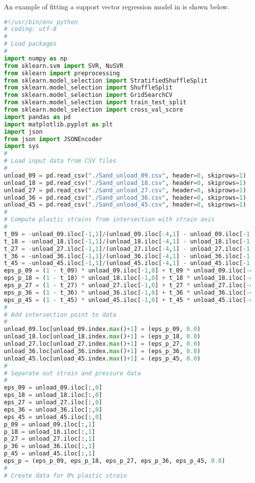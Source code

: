 An example of fitting a support vector regression model in  is shown below.
\begin{lstlisting}[language=Python]
#!/usr/bin/env python
# coding: utf-8
#
# Load packages
#
import numpy as np
from sklearn.svm import SVR, NuSVR
from sklearn import preprocessing
from sklearn.model_selection import StratifiedShuffleSplit
from sklearn.model_selection import ShuffleSplit
from sklearn.model_selection import GridSearchCV
from sklearn.model_selection import train_test_split
from sklearn.model_selection import cross_val_score
import pandas as pd
import matplotlib.pyplot as plt
import json
from json import JSONEncoder
import sys
#
# Load input data from CSV files
#
unload_09 = pd.read_csv("./Sand_unload_09.csv", header=0, skiprows=1)
unload_18 = pd.read_csv("./Sand_unload_18.csv", header=0, skiprows=1)
unload_27 = pd.read_csv("./Sand_unload_27.csv", header=0, skiprows=1)
unload_36 = pd.read_csv("./Sand_unload_36.csv", header=0, skiprows=1)
unload_45 = pd.read_csv("./Sand_unload_45.csv", header=0, skiprows=1)
#
# Compute plastic strains from intersection with strain axis
#
t_09 = -unload_09.iloc[-1,1]/(unload_09.iloc[-4,1] - unload_09.iloc[-1,1])
t_18 = -unload_18.iloc[-1,1]/(unload_18.iloc[-4,1] - unload_18.iloc[-1,1])
t_27 = -unload_27.iloc[-1,1]/(unload_27.iloc[-4,1] - unload_27.iloc[-1,1])
t_36 = -unload_36.iloc[-1,1]/(unload_36.iloc[-4,1] - unload_36.iloc[-1,1])
t_45 = -unload_45.iloc[-1,1]/(unload_45.iloc[-4,1] - unload_45.iloc[-1,1])
eps_p_09 = (1 - t_09) * unload_09.iloc[-1,0] + t_09 * unload_09.iloc[-4,0]
eps_p_18 = (1 - t_18) * unload_18.iloc[-1,0] + t_18 * unload_18.iloc[-4,0]
eps_p_27 = (1 - t_27) * unload_27.iloc[-1,0] + t_27 * unload_27.iloc[-4,0]
eps_p_36 = (1 - t_36) * unload_36.iloc[-1,0] + t_36 * unload_36.iloc[-4,0]
eps_p_45 = (1 - t_45) * unload_45.iloc[-1,0] + t_45 * unload_45.iloc[-4,0]
#
# Add intersection point to data
#
unload_09.loc[unload_09.index.max()+1] = (eps_p_09, 0.0)
unload_18.loc[unload_18.index.max()+1] = (eps_p_18, 0.0)
unload_27.loc[unload_27.index.max()+1] = (eps_p_27, 0.0)
unload_36.loc[unload_36.index.max()+1] = (eps_p_36, 0.0)
unload_45.loc[unload_45.index.max()+1] = (eps_p_45, 0.0)
#
# Separate out strain and pressure data
#
eps_09 = unload_09.iloc[:,0]
eps_18 = unload_18.iloc[:,0]
eps_27 = unload_27.iloc[:,0]
eps_36 = unload_36.iloc[:,0]
eps_45 = unload_45.iloc[:,0]
p_09 = unload_09.iloc[:,1]
p_18 = unload_18.iloc[:,1]
p_27 = unload_27.iloc[:,1]
p_36 = unload_36.iloc[:,1]
p_45 = unload_45.iloc[:,1]
eps_p = (eps_p_09, eps_p_18, eps_p_27, eps_p_36, eps_p_45, 0.0)
#
# Create data for 0% plastic strain

\end{lstlisting}
